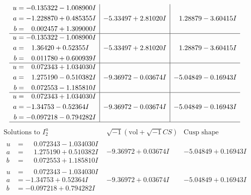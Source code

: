 \documentclass[1p]{elsarticle_modified}
\theoremstyle{definition}
\newcommand{\I}{\sqrt{-1}}
\begin{document}
$$\begin{array}{c|c|c}
\begin{aligned}
u &= -0.135322 - 1.008900 I \\
a &= -1.228870 + 0.485355 I \\
b &= \phantom{-}0.002457 + 1.309000 I\end{aligned}
 & -5.33497 + 2.81020 I & \phantom{-}1.28879 - 3.60415 I \\ \hline\begin{aligned}
u &= -0.135322 - 1.008900 I \\
a &= \phantom{-}1.36420 + 0.52355 I \\
b &= \phantom{-}0.011780 + 0.600939 I\end{aligned}
 & -5.33497 + 2.81020 I & \phantom{-}1.28879 - 3.60415 I \\ \hline\begin{aligned}
u &= \phantom{-}0.072343 + 1.034030 I \\
a &= \phantom{-}1.275190 - 0.510382 I \\
b &= \phantom{-}0.072553 - 1.185810 I\end{aligned}
 & -9.36972 - 0.03674 I & -5.04849 - 0.16943 I \\ \hline\begin{aligned}
u &= \phantom{-}0.072343 + 1.034030 I \\
a &= -1.34753 - 0.52364 I \\
b &= -0.097218 - 0.794282 I\end{aligned}
 & -9.36972 - 0.03674 I & -5.04849 - 0.16943 I\\
 \hline 
 \end{array}$$\newpage$$\begin{array}{c|c|c}  
\text{Solutions to }I^u_{2}& \I (\text{vol} + \sqrt{-1}CS) & \text{Cusp shape}\\
 \hline 
\begin{aligned}
u &= \phantom{-}0.072343 - 1.034030 I \\
a &= \phantom{-}1.275190 + 0.510382 I \\
b &= \phantom{-}0.072553 + 1.185810 I\end{aligned}
 & -9.36972 + 0.03674 I & -5.04849 + 0.16943 I \\ \hline\begin{aligned}
u &= \phantom{-}0.072343 - 1.034030 I \\
a &= -1.34753 + 0.52364 I \\
b &= -0.097218 + 0.794282 I\end{aligned}
 & -9.36972 + 0.03674 I & -5.04849 + 0.16943 I \\ \hline\begin{aligned}

\end{aligned}
\end{array}$$
\end{document}
